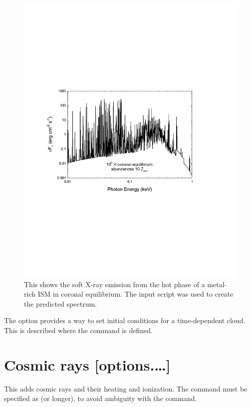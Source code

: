 \begin{figure}
\centering
\includegraphics{coronal}
\caption[X-ray emission spectrum]
{\label{fig:coronal}This shows the soft X-ray emission from
the hot phase of a metal-rich ISM in coronal equilibrium.
The input script  was used
to create the predicted spectrum. }
\end{figure}

The  option provides a way to set initial conditions
for a time-dependent cloud.
This is described where the  command is defined.

\section{Cosmic rays [options.\dots]}

This adds cosmic rays and their heating and ionization.  The command
must be specified as  (or longer), to avoid ambiguity
with the  command.

